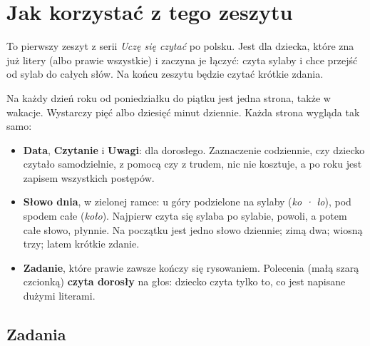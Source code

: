 \section*{Jak korzystać z tego zeszytu}

To pierwszy zeszyt z serii \emph{Uczę się czytać} po polsku. Jest dla
dziecka, które zna już litery (albo prawie wszystkie) i zaczyna je
łączyć: czyta sylaby i chce przejść od sylab do całych słów. Na końcu
zeszytu będzie czytać krótkie zdania.

Na każdy dzień roku od poniedziałku do piątku jest jedna strona, także
w wakacje. Wystarczy pięć albo dziesięć minut dziennie. Każda strona
wygląda tak samo:

\begin{itemize}[leftmargin=6mm]
\item \textbf{Data}, \textbf{Czytanie} i \textbf{Uwagi}: dla
  dorosłego. Zaznaczenie codziennie, czy dziecko czytało samodzielnie,
  z pomocą czy z trudem, nic nie kosztuje, a po roku jest zapisem
  wszystkich postępów.
\item \textbf{Słowo dnia}, w zielonej ramce: u góry podzielone na
  sylaby (\emph{ko · ło}), pod spodem całe (\emph{koło}). Najpierw
  czyta się sylaba po sylabie, powoli, a potem całe słowo, płynnie. Na
  początku jest jedno słowo dziennie; zimą dwa; wiosną trzy; latem
  krótkie zdanie.
\item \textbf{Zadanie}, które prawie zawsze kończy się rysowaniem.
  Polecenia (małą szarą czcionką) \textbf{czyta dorosły} na głos:
  dziecko czyta tylko to, co jest napisane dużymi literami.
\end{itemize}

\subsection*{Zadania}


